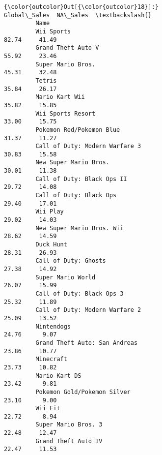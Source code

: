 \documentclass[11pt]{article}
\begin{document}
\begin{Verbatim}[commandchars=\\\{\}]
{\color{outcolor}Out[{\color{outcolor}18}]:}                                                     Global\_Sales  NA\_Sales  \textbackslash{}
         Name                                                                         
         Wii Sports                                                 82.74     41.49   
         Grand Theft Auto V                                         55.92     23.46   
         Super Mario Bros.                                          45.31     32.48   
         Tetris                                                     35.84     26.17   
         Mario Kart Wii                                             35.82     15.85   
         Wii Sports Resort                                          33.00     15.75   
         Pokemon Red/Pokemon Blue                                   31.37     11.27   
         Call of Duty: Modern Warfare 3                             30.83     15.58   
         New Super Mario Bros.                                      30.01     11.38   
         Call of Duty: Black Ops II                                 29.72     14.08   
         Call of Duty: Black Ops                                    29.40     17.01   
         Wii Play                                                   29.02     14.03   
         New Super Mario Bros. Wii                                  28.62     14.59   
         Duck Hunt                                                  28.31     26.93   
         Call of Duty: Ghosts                                       27.38     14.92   
         Super Mario World                                          26.07     15.99   
         Call of Duty: Black Ops 3                                  25.32     11.89   
         Call of Duty: Modern Warfare 2                             25.09     13.52   
         Nintendogs                                                 24.76      9.07   
         Grand Theft Auto: San Andreas                              23.86     10.77   
         Minecraft                                                  23.73     10.82   
         Mario Kart DS                                              23.42      9.81   
         Pokemon Gold/Pokemon Silver                                23.10      9.00   
         Wii Fit                                                    22.72      8.94   
         Super Mario Bros. 3                                        22.48     12.47   
         Grand Theft Auto IV                                        22.47     11.53   

\end{Verbatim}
\end{document}
